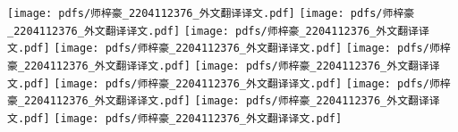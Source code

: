 

{\centering
\vspace{-5ex}
\texttt{[image: pdfs/师梓豪\_2204112376\_外文翻译译文.pdf]}
\texttt{[image: pdfs/师梓豪\_2204112376\_外文翻译译文.pdf]}
\texttt{[image: pdfs/师梓豪\_2204112376\_外文翻译译文.pdf]}
\texttt{[image: pdfs/师梓豪\_2204112376\_外文翻译译文.pdf]}
\texttt{[image: pdfs/师梓豪\_2204112376\_外文翻译译文.pdf]}
\texttt{[image: pdfs/师梓豪\_2204112376\_外文翻译译文.pdf]}
\texttt{[image: pdfs/师梓豪\_2204112376\_外文翻译译文.pdf]}
\texttt{[image: pdfs/师梓豪\_2204112376\_外文翻译译文.pdf]}
\texttt{[image: pdfs/师梓豪\_2204112376\_外文翻译译文.pdf]}
\texttt{[image: pdfs/师梓豪\_2204112376\_外文翻译译文.pdf]}
}

